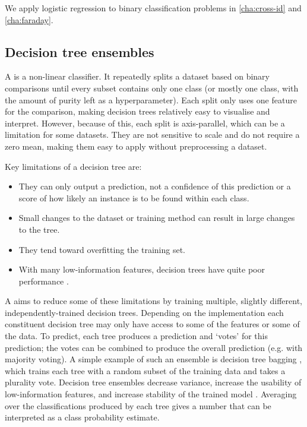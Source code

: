         We apply logistic regression to binary classification problems in \autoref{cha:cross-id} and \autoref{cha:faraday}.

    \subsection{Decision tree ensembles}
    \label{sec:decision-trees}

        A  is a non-linear classifier. It repeatedly splits a dataset based on binary comparisons until every subset contains only one class (or mostly one class, with the amount of purity left as a hyperparameter). Each split only uses one feature for the comparison, making decision trees relatively easy to visualise and interpret. However, because of this, each split is axis-parallel, which can be a limitation for some datasets. They are not sensitive to scale and do not require a zero mean, making them easy to apply without preprocessing a dataset.

        Key limitations of a decision tree are:
        \begin{itemize}
            \item They can only output a prediction, not a confidence of this prediction or a score of how likely an instance is to be found within each class.
            \item Small changes to the dataset or training method can result in large changes to the tree.
            \item They tend toward overfitting the training set.
            \item With many low-information features, decision trees have quite poor performance \citep{breiman01random-forest}.
        \end{itemize}

        A  aims to reduce some of these limitations by training multiple, slightly different, independently-trained decision trees. Depending on the implementation each constituent decision tree may only have access to some of the features or some of the data. To predict, each tree produces a prediction and `votes' for this prediction; the votes can be combined to produce the overall prediction (e.g. with majority voting). A simple example of such an ensemble is decision tree bagging \citep{breiman_bagging_1996}, which trains each tree with a random subset of the training data and takes a plurality vote. Decision tree ensembles decrease variance, increase the usability of low-information features, and increase stability of the trained model \citep{breiman01random-forest}. Averaging over the classifications produced by each tree gives a number that can be interpreted as a class probability estimate.

